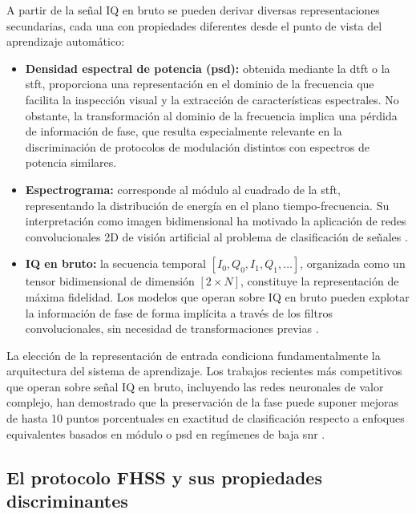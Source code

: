 A partir de la señal IQ en bruto se pueden derivar diversas representaciones
secundarias, cada una con propiedades diferentes desde el punto de vista del
aprendizaje automático:

\begin{itemize}
 \item \textbf{Densidad espectral de potencia (\gls{psd}):} obtenida mediante la
 \gls{dtft} o la \gls{stft}, proporciona una representación en el dominio de la
 frecuencia que facilita la inspección visual y la extracción de características
 espectrales. No obstante, la transformación al dominio de la frecuencia implica
 una pérdida de información de fase, que resulta especialmente relevante en la
 discriminación de protocolos de modulación distintos con espectros de potencia
 similares.

 \item \textbf{Espectrograma:} corresponde al módulo al cuadrado de la \gls{stft},
 representando la distribución de energía en el plano tiempo-frecuencia. Su
 interpretación como imagen bidimensional ha motivado la aplicación de redes
 convolucionales 2D de visión artificial al problema de clasificación de señales
 \cite{gluge_robust_2024}.

 \item \textbf{IQ en bruto:} la secuencia temporal $[I_0, Q_0, I_1, Q_1, \ldots]$,
 organizada como un tensor bidimensional de dimensión $[2 \times N]$, constituye
 la representación de máxima fidelidad. Los modelos que operan sobre IQ en bruto
 pueden explotar la información de fase de forma implícita a través de los filtros
 convolucionales, sin necesidad de transformaciones previas \cite{zheng_deep_2025}.
\end{itemize}

La elección de la representación de entrada condiciona fundamentalmente la arquitectura
del sistema de aprendizaje. Los trabajos recientes más competitivos que operan sobre
señal IQ en bruto, incluyendo las redes neuronales de valor complejo, han demostrado
que la preservación de la fase puede suponer mejoras de hasta 10 puntos porcentuales
en exactitud de clasificación respecto a enfoques equivalentes basados en módulo o
\gls{psd} en regímenes de baja \gls{snr} \cite{alam_rf-enabled_2023}.

\subsection{El protocolo FHSS y sus propiedades discriminantes}
\label{subsec:fhss}

